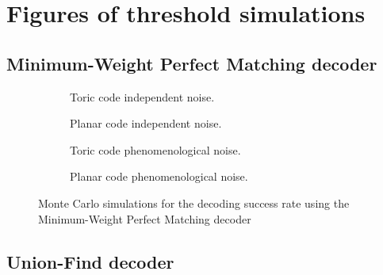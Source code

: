 \chapter{Figures of threshold simulations}\label{ap:figures}

\section{Minimum-Weight Perfect Matching decoder}\label{ap:figmwpm}

\begin{figure}[htbp]
    \centering
    \begin{subfigure}[b]{0.49\textwidth}
      \begin{adjustbox}{Clip=0 1em 0 0}
        
      \end{adjustbox}
      \caption{Toric code independent noise.}
    \end{subfigure}
    \begin{subfigure}[b]{0.49\textwidth}
      \begin{adjustbox}{Clip=0 1em 0 0}
        
      \end{adjustbox}
      \caption{Planar code independent noise.}
    \end{subfigure}
    \begin{subfigure}[b]{0.49\textwidth}
      \begin{adjustbox}{Clip=0 1em 0 0}
        
      \end{adjustbox}
      \caption{Toric code phenomenological noise.}
    \end{subfigure}
    \begin{subfigure}[b]{0.49\textwidth}
      \begin{adjustbox}{Clip=0 1em 0 0}
        
      \end{adjustbox}
      \caption{Planar code phenomenological noise.}
    \end{subfigure}
    \caption{Monte Carlo simulations for the decoding success rate using the Minimum-Weight Perfect Matching decoder}
    \label{fig:threshold_mwpm}
  \end{figure}


\section{Union-Find decoder}\label{ap:figuf}

